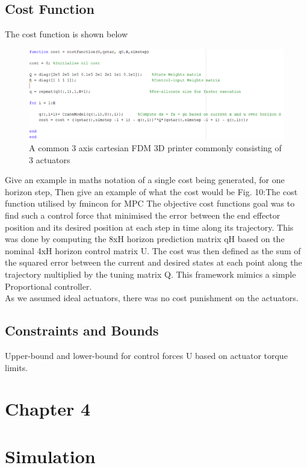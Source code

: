 \documentclass{UoNMCHA}
\numberwithin{equation}{section}
\begin{document}
\subsection*{Cost Function}
The cost function is shown below

\begin{figure}[H]
	\begin{center}
		\includegraphics[width=.5\linewidth]{figs/Picture12}
		\caption{A  common 3 axis cartesian FDM 3D printer commonly consisting of 3 actuators}
		\label{figs/Picture12}
	\end{center}
\end{figure}


Give an example in maths notation of a single cost being generated, for one horizon step,
Then give an example of what the cost would be 
Fig. 10:The cost function utilised by fmincon for MPC
The objective cost functions goal was to find such a control force that minimised the error between the end effector position and its desired position at each step in time along its trajectory. This was done by computing the 8xH horizon prediction matrix qH based on the nominal 4xH horizon control matrix U. The cost was then defined as the sum of the squared error between the current and desired states at each point along the trajectory multiplied by the tuning matrix Q. This framework mimics a simple Proportional controller. \\
As we assumed ideal actuators, there was no cost punishment on the actuators.
\subsection*{Constraints and Bounds}
Upper-bound and lower-bound for control forces U based on actuator torque limits.


\newpage
\section*{Chapter 4}
\section{Simulation}
\end{document}
